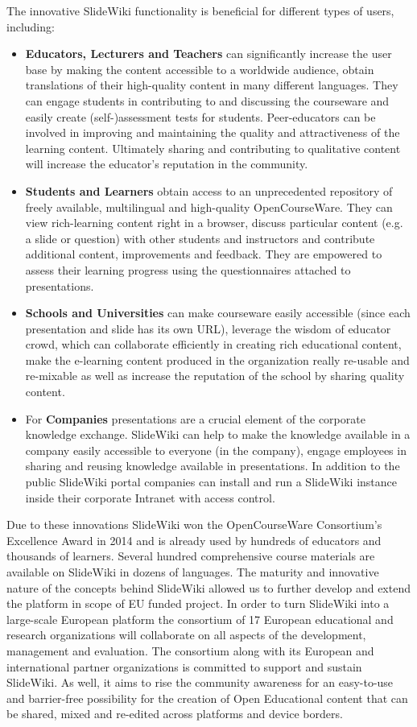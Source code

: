 \documentclass[ngerman,UKenglish,table]{scrbook}
\begin{document}
The innovative SlideWiki functionality is beneficial for different types of users, including:
\begin{itemize}
\item \textbf{Educators, Lecturers and Teachers} can significantly increase the user base by making the content accessible to a worldwide audience, obtain translations of their high-quality content in many different languages.
They can engage students in contributing to and discussing the courseware and easily create (self-)assessment tests for students.
Peer-educators can be involved in improving and maintaining the quality and attractiveness of the learning content.
Ultimately sharing and contributing to qualitative content will increase the educator’s reputation in the community.
\item\textbf{ Students and Learners} obtain access to an unprecedented repository of freely available, multilingual and high-quality OpenCourseWare.
They can view rich-learning content right in a browser, discuss particular content (e.g. a slide or question) with other students and instructors and contribute additional content, improvements and feedback.
They are empowered to assess their learning progress using the questionnaires attached to presentations.
\item \textbf{Schools and Universities} can make courseware easily accessible (since each presentation and slide has its own URL), leverage the wisdom of educator crowd, which can collaborate efficiently in creating rich educational content, make the e-learning content produced in the organization really re-usable and re-mixable as well as increase the reputation of the school by sharing quality content.
\item For \textbf{Companies} presentations are a crucial element of the corporate knowledge exchange.
SlideWiki can help to make the knowledge available in a company easily accessible to everyone (in the company), engage employees in sharing and reusing knowledge available in presentations.
In addition to the public SlideWiki portal companies can install and run a SlideWiki instance inside their corporate Intranet with access control.
\end{itemize}

Due to these innovations SlideWiki won the OpenCourseWare Consortium’s Excellence Award in 2014 and is already used by hundreds of educators and thousands of learners.
Several hundred comprehensive course materials are available on SlideWiki in dozens of languages.
The maturity and innovative nature of the concepts behind SlideWiki allowed us to further develop and extend the platform in scope of EU funded project.
In order to turn SlideWiki into a large-scale European platform the consortium of 17 European educational and research organizations will collaborate on all aspects of the development, management and evaluation. 
The consortium along with its European and international partner organizations is committed to support and sustain SlideWiki.
As well, it aims to rise the community awareness for an easy-to-use and barrier-free possibility for the creation of Open Educational content that can be shared, mixed and re-edited across platforms and device borders.
\end{document}
